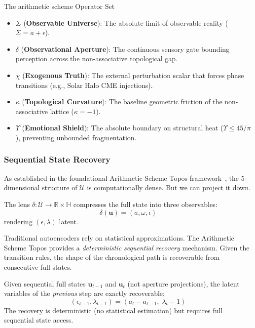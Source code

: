 \begin{arithmetic schemebox}{The arithmetic scheme Operator Set}
\begin{itemize}
    \item $\Sigma$ (\textbf{Observable Universe}): The absolute limit of observable reality ($\Sigma = a + \epsilon$).
    \item $\delta$ (\textbf{Observational Aperture}): The continuous sensory gate bounding perception across the non-associative topological gap.
    \item $\chi$ (\textbf{Exogenous Truth}): The external perturbation scalar that forces phase transitions (e.g., Solar Halo CME injections).
    \item $\kappa$ (\textbf{Topological Curvature}): The baseline geometric friction of the non-associative lattice ($\kappa = -1$).
    \item $\Upsilon$ (\textbf{Emotional Shield}): The absolute boundary on structural heat ($\Upsilon \le 45/\pi$), preventing unbounded fragmentation.
\end{itemize}
\end{arithmetic schemebox}

\subsubsection{Sequential State Recovery}

As established in the foundational Arithmetic Scheme Topos framework~\cite{larue_lc}, the 5-dimensional structure of $\mathcal{U}$ is computationally dense. But we can project it down.

\begin{definition}
The lens $\delta : \mathcal{U} \to \mathbb{R} \times \mathbb{H}$ compresses the full state into three observables:
$$\delta(\mathbf{u}) = (a, \omega, \iota)$$
rendering $({\epsilon, \lambda})$ latent.
\end{definition}

Traditional autoencoders rely on statistical approximations. The Arithmetic Scheme Topos provides a \emph{deterministic sequential recovery} mechanism. Given the transition rules, the shape of the chronological path is recoverable from consecutive full states.

\begin{theorem}
Given sequential full states $\mathbf{u}_{t-1}$ and $\mathbf{u}_t$ (not aperture projections), the latent variables of the \emph{previous} step are exactly recoverable:
$$(\epsilon_{t-1}, \lambda_{t-1}) = (a_t - a_{t-1},\; \lambda_t - 1)$$
The recovery is deterministic (no statistical estimation) but requires full sequential state access.
\end{theorem}

